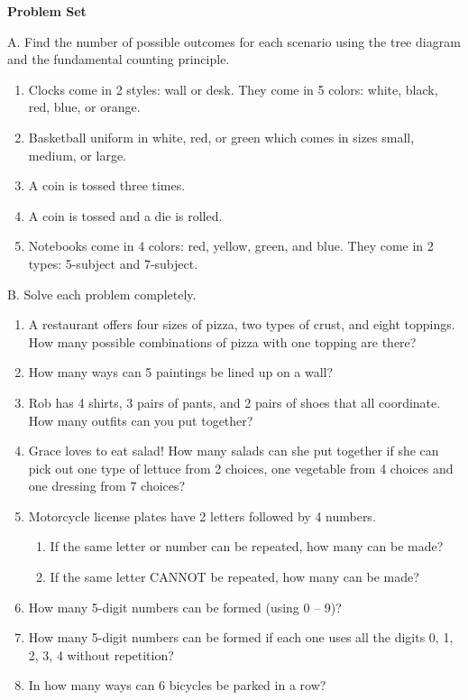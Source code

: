 \textbf{Problem Set}

\vspce

A. Find the number of possible outcomes for each scenario using the tree diagram and the fundamental counting principle. 
 
\begin{enumerate}[label = \arabic*. ]

\item Clocks come in 2 styles: wall or desk. They come in 5 colors: white, black, red, blue, or orange.
\item Basketball uniform in white, red, or green which comes in sizes small, medium, or large.
\item A coin is tossed three times.
\item A coin is tossed  and a die is rolled. 
\item Notebooks come in 4 colors: red, yellow, green, and blue. They come in 2 types: 5-subject and 7-subject.
\end{enumerate}   
 
B. Solve each problem completely. 

\begin{enumerate}[label = \arabic*. ]

\item  A restaurant offers four sizes of pizza, two types of crust, and eight toppings. How many possible combinations of pizza with one topping are there? 
\item  How many ways can 5 paintings be lined up on a wall? 
\item  Rob has 4 shirts, 3 pairs of pants, and 2 pairs of shoes that all coordinate. How many 
outfits can you put together? 
\item  Grace loves to eat salad! How many salads can she put together if she can pick out one type of lettuce from 2 choices, one vegetable from 4 choices and one dressing from 7 choices? 
\item  Motorcycle license plates have 2 letters followed by 4 numbers. 
\begin{enumerate}[label = \alph*. ]
\item If the same letter or number can be repeated, how many can be made?
\item If the same letter CANNOT be repeated, how many can be made?
\end{enumerate} 
 
\item  How many 5-digit numbers can be formed (using 0 – 9)? 
\item  How many 5-digit numbers can be formed if each one uses all the digits 0, 1, 2, 3, 4 
without repetition? 
\item  In how many ways can 6 bicycles be parked in a row? 

\end{enumerate} 